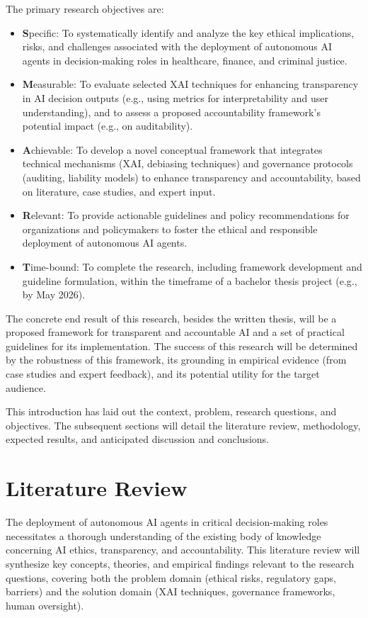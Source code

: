 \documentclass[english]{hogent-article}
\begin{document}
The primary research objectives are:
\begin{itemize}
    \item \textbf{S}pecific: To systematically identify and analyze the key ethical implications, risks, and challenges associated with the deployment of autonomous AI agents in decision-making roles in healthcare, finance, and criminal justice.
    \item \textbf{M}easurable: To evaluate selected XAI techniques for enhancing transparency in AI decision outputs (e.g., using metrics for interpretability and user understanding), and to assess a proposed accountability framework's potential impact (e.g., on auditability).
    \item \textbf{A}chievable: To develop a novel conceptual framework that integrates technical mechanisms (XAI, debiasing techniques) and governance protocols (auditing, liability models) to enhance transparency and accountability, based on literature, case studies, and expert input.
    \item \textbf{R}elevant: To provide actionable guidelines and policy recommendations for organizations and policymakers to foster the ethical and responsible deployment of autonomous AI agents.
    \item \textbf{T}ime-bound: To complete the research, including framework development and guideline formulation, within the timeframe of a bachelor thesis project (e.g., by May 2026).
\end{itemize}
The concrete end result of this research, besides the written thesis, will be a proposed framework for transparent and accountable AI and a set of practical guidelines for its implementation. The success of this research will be determined by the robustness of this framework, its grounding in empirical evidence (from case studies and expert feedback), and its potential utility for the target audience.

This introduction has laid out the context, problem, research questions, and objectives. The subsequent sections will detail the literature review, methodology, expected results, and anticipated discussion and conclusions.

\section{Literature Review}%
\label{sec:literature review}

The deployment of autonomous AI agents in critical decision-making roles necessitates a thorough understanding of the existing body of knowledge concerning AI ethics, transparency, and accountability. This literature review will synthesize key concepts, theories, and empirical findings relevant to the research questions, covering both the problem domain (ethical risks, regulatory gaps, barriers) and the solution domain (XAI techniques, governance frameworks, human oversight).
\end{document}
